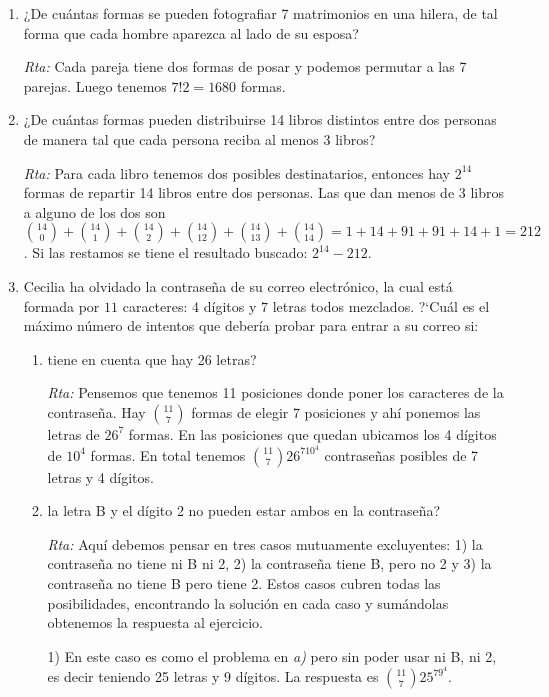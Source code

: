 \documentclass[a4paper,12pt,twoside,spanish,reqno]{amsbook}
\numberwithin{equation}{section}
\begin{document}
\begin{enumerate}
\medskip

\item ¿De cuántas formas se pueden fotografiar 7 matrimonios en una hilera, de tal forma
que cada hombre aparezca al lado de su esposa?

\noindent\textit{Rta:} Cada pareja tiene dos formas de posar y podemos permutar a las 7 parejas. Luego tenemos $7!2=1680$ formas.

\medskip

\item ¿De cuántas formas pueden distribuirse 14 libros distintos entre dos personas de
manera tal que cada persona reciba al menos 3 libros?

\noindent\textit{Rta:} Para cada libro tenemos dos posibles destinatarios, entonces hay $2^{14}$ formas de repartir 14 libros entre dos personas.  Las que dan menos de 3 libros a alguno de los dos son $\binom{14}{0}+\binom{14}{1}+\binom{14}{2}+\binom{14}{12}+\binom{14}{13}+\binom{14}{14}=1+14+91+91+14+1=212$. Si las restamos se tiene el resultado buscado: $2^{14}-212$.



\item
Cecilia ha olvidado la contraseña de su correo electrónico, la cual est\'a formada por $11$ caracteres: $4$ d\'igitos y $7$ letras todos mezclados. ?`Cu\'al es el m\'aximo n\'umero de intentos que deber\'ia probar para entrar a su correo si:
\begin{enumerate}
    \item  tiene en cuenta que hay 26 letras?
    
    \textit{Rta:} Pensemos que tenemos 11 posiciones donde poner los caracteres de la contraseña. Hay $\binom{11}{7}$ formas de elegir 7 posiciones y ahí ponemos las letras de $26^7$ formas. En  las  posiciones que quedan ubicamos los 4 dígitos de $10^4$ formas. En total tenemos $\binom{11}{7}26^710^4$   contraseñas posibles de 7 letras y 4 dígitos.
    
    \item la letra B y el d\'igito 2 no pueden estar ambos en la contraseña?
    
    \textit{Rta:} Aquí debemos pensar en  tres casos mutuamente excluyentes: 1) la contraseña no tiene ni B ni 2, 2) la contraseña tiene B, pero no 2 y 3) la contraseña no tiene B pero tiene 2. Estos casos cubren todas las posibilidades,  encontrando  la solución en cada caso y sumándolas obtenemos la respuesta al ejercicio.
    
    1) En  este caso es como  el problema en \textit{a)} pero sin poder usar ni B, ni 2,  es decir teniendo 25 letras y 9 dígitos. La respuesta es $\binom{11}{7}25^79^4$.
    

\end{enumerate}
\end{enumerate}
\end{document}
